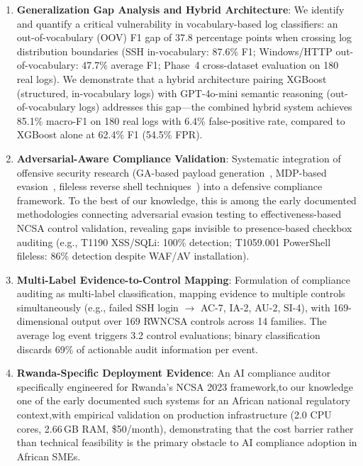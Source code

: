 \documentclass[futureinternet,article,submit,pdftex,moreauthors]{Definitions/mdpi}
\begin{document}
\begin{enumerate}
\item \textbf{Generalization Gap Analysis and Hybrid Architecture}: We identify and quantify
a critical vulnerability in vocabulary-based log classifiers: an out-of-vocabulary (OOV) F1
gap of 37.8 percentage points when crossing log distribution boundaries (SSH in-vocabulary:
87.6\% F1; Windows/HTTP out-of-vocabulary: 47.7\% average F1; Phase~4 cross-dataset evaluation
on 180 real logs). We demonstrate that a hybrid architecture pairing XGBoost
(structured, in-vocabulary logs) with GPT-4o-mini semantic reasoning (out-of-vocabulary
logs) addresses this gap---the combined hybrid system achieves 85.1\% macro-F1 on 180 real
logs with 6.4\% false-positive rate, compared to XGBoost alone at 62.4\% F1 (54.5\% FPR).

\item \textbf{Adversarial-Aware Compliance Validation}: Systematic integration of offensive
security research (GA-based payload generation~\cite{ga_xss_paper}, MDP-based
evasion~\cite{dp_payload_paper}, fileless reverse shell techniques~\cite{reverse_shell_paper})
into a defensive compliance framework. To the best of our knowledge, this is among the early documented
methodologies connecting adversarial evasion testing to effectiveness-based NCSA control
validation, revealing gaps invisible to presence-based checkbox auditing
(e.g., T1190 XSS/SQLi: 100\% detection; T1059.001 PowerShell fileless: 86\% detection despite WAF/AV installation).

\item \textbf{Multi-Label Evidence-to-Control Mapping}: Formulation of compliance auditing as
multi-label classification, mapping evidence to multiple controls simultaneously
(e.g., failed SSH login $\rightarrow$ AC-7, IA-2, AU-2, SI-4), with 169-dimensional output
over 169 RWNCSA controls across 14 families. The average log event triggers 3.2 control
evaluations; binary classification discards 69\% of actionable audit information per event.

\item \textbf{Rwanda-Specific Deployment Evidence}: An AI compliance auditor specifically
engineered for Rwanda's NCSA 2023 framework,to our knowledge one of the early documented
such systems for an African national regulatory context,with empirical validation on
production infrastructure (2.0 CPU cores, 2.66\,GB RAM, \$50/month), demonstrating that
the cost barrier rather than technical feasibility is the primary obstacle to AI compliance
adoption in African SMEs.
\end{enumerate}
\end{document}
